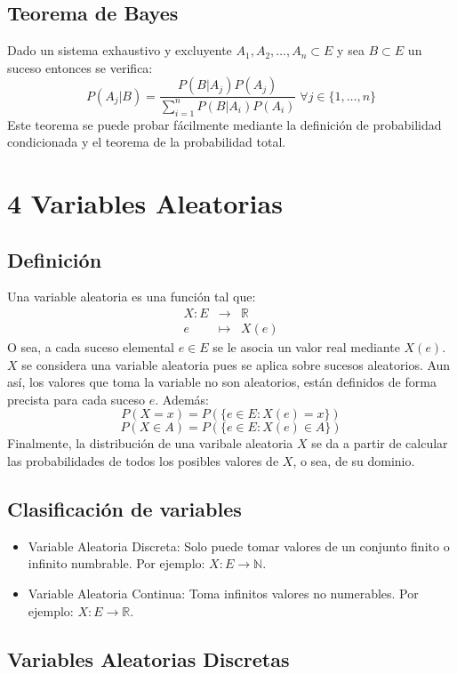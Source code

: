 \documentclass[10pt,a4paper]{book}
\newcommand{\cchap}[2]{
	\setcounter{chapter}{#1}
	\chapter*{\color{blue}\textbf{#1} \color{black} #2}
	\setcounter{section}{0}
}
\begin{document}
\section{Teorema de Bayes}
Dado un sistema exhaustivo y excluyente $A_1, A_2, \dots, A_n\subset E$ y sea $B\subset E$ un suceso entonces se verifica:
\[P(A_j|B) = \frac{P(B|A_j)P(A_j)}{\sum\limits_{i=1}^nP(B|A_i)P(A_i)}\;\forall j\in\{1,\dots,n\}\]
Este teorema se puede probar fácilmente mediante la definición de probabilidad condicionada y el teorema de la probabilidad total.

\cchap{4}{Variables Aleatorias}
\section{Definición}
Una variable aleatoria es una función tal que:
\[\begin{array}{rcl}
	X:E & \longrightarrow & \mathbb{R}\\
	e & \longmapsto & X(e)
\end{array}\]
O sea, a cada suceso elemental $e\in E$ se le asocia un valor real mediante $X(e)$. $X$ se considera una variable aleatoria pues se aplica sobre sucesos aleatorios. Aun así, los valores que toma la variable no son aleatorios, están definidos de forma precista para cada suceso $e$. Además: 
\[P(X = x) = P(\{ e\in E : X(e) = x \})\]
\[P(X\in A) = P(\{ e\in E : X(e)\in A \})\]
Finalmente, la distribución de una varibale aleatoria $X$ se da a partir de calcular las probabilidades de todos los posibles valores de $X$, o sea, de su dominio.

\section{Clasificación de variables}
\begin{itemize}
	\item Variable Aleatoria Discreta: Solo puede tomar valores de un conjunto finito o infinito numbrable. Por ejemplo: $X:E\to\mathbb{N}$.
	\item Variable Aleatoria Continua: Toma infinitos valores no numerables. Por ejemplo: $X:E\to\mathbb{R}$.
\end{itemize}

\section{Variables Aleatorias Discretas}
\end{document}
